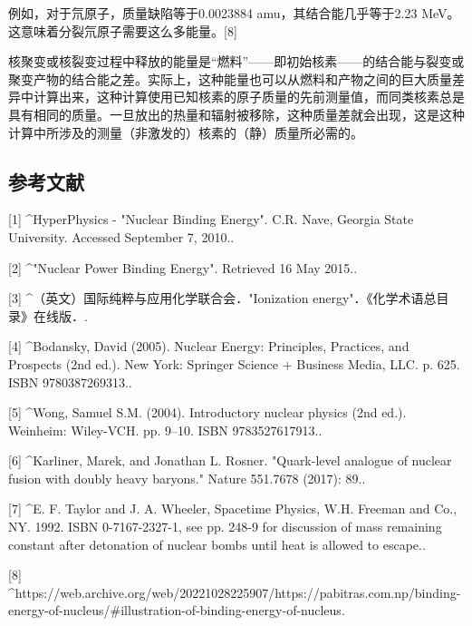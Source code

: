 例如，对于氘原子，质量缺陷等于0.0023884 amu，其结合能几乎等于2.23 MeV。这意味着分裂氘原子需要这么多能量。[8]

核聚变或核裂变过程中释放的能量是“燃料”——即初始核素——的结合能与裂变或聚变产物的结合能之差。实际上，这种能量也可以从燃料和产物之间的巨大质量差异中计算出来，这种计算使用已知核素的原子质量的先前测量值，而同类核素总是具有相同的质量。一旦放出的热量和辐射被移除，这种质量差就会出现，这是这种计算中所涉及的测量（非激发的）核素的（静）质量所必需的。

\subsection{参考文献}
[1]
^HyperPhysics - "Nuclear Binding Energy". C.R. Nave, Georgia State University. Accessed September 7, 2010..

[2]
^"Nuclear Power Binding Energy". Retrieved 16 May 2015..

[3]
^（英文）国际纯粹与应用化学联合会．"Ionization energy"．《化学术语总目录》在线版．.

[4]
^Bodansky, David (2005). Nuclear Energy: Principles, Practices, and Prospects (2nd ed.). New York: Springer Science + Business Media, LLC. p. 625. ISBN 9780387269313..

[5]
^Wong, Samuel S.M. (2004). Introductory nuclear physics (2nd ed.). Weinheim: Wiley-VCH. pp. 9–10. ISBN 9783527617913..

[6]
^Karliner, Marek, and Jonathan L. Rosner. "Quark-level analogue of nuclear fusion with doubly heavy baryons." Nature 551.7678 (2017): 89..

[7]
^E. F. Taylor and J. A. Wheeler, Spacetime Physics, W.H. Freeman and Co., NY. 1992. ISBN 0-7167-2327-1, see pp. 248-9 for discussion of mass remaining constant after detonation of nuclear bombs until heat is allowed to escape..

[8]
^https://web.archive.org/web/20221028225907/https://pabitras.com.np/binding-energy-of-nucleus/#illustration-of-binding-energy-of-nucleus.
